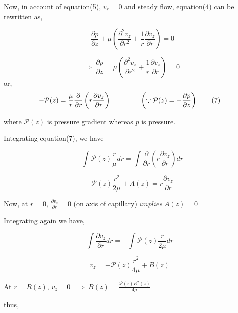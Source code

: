 \documentclass[12pt, a4paper]{article} %
\begin{document}
Now, in account of equation(5), $v_r = 0$ and steady flow, equation(4) can be rewritten as,

\begin{equation*}
    -\frac{\partial p}{\partial z} + \mu\left(\frac{\partial^2 v_z}{\partial r^2} +\frac{1}{r}\frac{\partial v_z}{\partial r}\right) = 0
\end{equation*}

\begin{equation*}
    \implies\ \frac{\partial p}{\partial z} = \mu\left(\frac{\partial^2 v_z}{\partial r^2} +\frac{1}{r}\frac{\partial v_z}{\partial r}\right) = 0 \tag*{(6)}
\end{equation*}
or,
\begin{equation*}
    -\mathcal{P}(z) = \frac{\mu}{r}\frac{\partial}{\partial r}\left(r\frac{\partial v_z}{\partial r}\right)\hspace*{1.5cm} \left(\because \mathcal{P}(z) = -\frac{\partial p}{\partial z}\right)\tag*{(7)}
\end{equation*}

where $\mathcal{P}(z)$ is pressure gradient whereas $p$ is pressure.

Integrating equation(7), we have

\begin{equation*}
    -\int \mathcal{P}(z)\frac{r}{\mu} dr = \int \frac{\partial}{\partial r}\left(r\frac{\partial v_z}{\partial r}\right)dr
\end{equation*}

\begin{equation*}
    -\mathcal{P}(z)\frac{r^2}{2 \mu} + A(z) = r\frac{\partial v_z}{\partial r}
\end{equation*}

Now, at $r = 0$, $\displaystyle \frac{\partial v_z}{\partial r} = 0$ (on axis of capillary) $implies\ A(z) = 0$

Integrating again we have,

\begin{equation*}
    \int \frac{\partial v_z}{\partial r} dr = -\int \mathcal{P}(z)\frac{r}{2 \mu} dr
\end{equation*}

\begin{equation*}
    v_z = -\mathcal{P}(z)\frac{r^2}{4 \mu} + B(z)
\end{equation*}

At $r = R(z)$, $v_z = 0$  $\displaystyle \implies\ B(z) = \frac{\mathcal{P}(z) R^2(z)}{4 \mu}$ 

thus,
\end{document}
